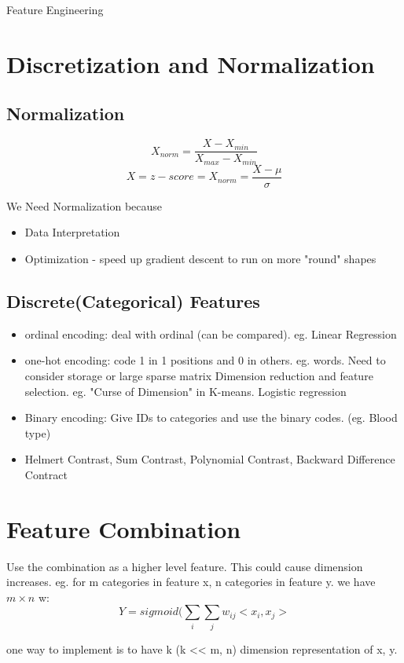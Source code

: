 \documentclass[11pt, openany]{book}              %
\begin{document}
Feature Engineering
\section{Discretization and Normalization}

\subsection{Normalization}

$$ X_{norm} = \frac{X -  X_{min}}{X_{max} - X_{min}}$$
$$ X = z-score = X_{norm} = \frac{X - \mu}{\sigma}$$

We Need Normalization because
\begin{itemize}
	\item Data Interpretation
	\item Optimization - speed up gradient descent to run on more "round" shapes	
\end{itemize}

\subsection{Discrete(Categorical) Features}

\begin{itemize}
	\item ordinal encoding: deal with ordinal (can be compared). eg. Linear Regression
	\item one-hot encoding: code 1 in 1 positions and 0 in others. eg. words. Need to consider
		\subitem storage or large sparse matrix
		\subitem Dimension reduction and feature selection. eg. "Curse of Dimension" in K-means. Logistic regression
	\item Binary encoding: Give IDs to categories and use the binary codes. (eg. Blood type)
	\item Helmert Contrast, Sum Contrast, Polynomial Contrast, Backward Difference Contract
\end{itemize}

\section{Feature Combination}

Use the combination as a higher level feature. This could cause dimension increases. eg. for m categories in feature x, n categories in feature y. we have $m \times n$ w:
$$Y = sigmoid(\sum_i \sum_j w_{ij} <x_i,x_j>$$

one way to implement is to have k (k << m, n) dimension representation of x, y.
\end{document}
